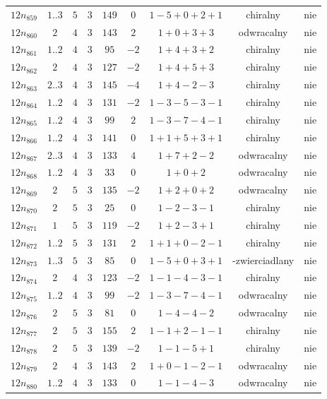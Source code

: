 \begin{longtable}{ccccccccc}
$12n_{859}$ & $1..3$ & $5$ & $3$ & $149$ & $0$ & $1-5+0+2+1$ & chiralny & nie \\
$12n_{860}$ & $2$ & $4$ & $3$ & $143$ & $2$ & $1+0+3+3$ & odwracalny & nie \\
$12n_{861}$ & $1..2$ & $4$ & $3$ & $95$ & $-2$ & $1+4+3+2$ & chiralny & nie \\
$12n_{862}$ & $2$ & $4$ & $3$ & $127$ & $-2$ & $1+4+5+3$ & chiralny & nie \\
$12n_{863}$ & $2..3$ & $4$ & $3$ & $145$ & $-4$ & $1+4-2-3$ & chiralny & nie \\
$12n_{864}$ & $1..2$ & $4$ & $3$ & $131$ & $-2$ & $1-3-5-3-1$ & chiralny & nie \\
$12n_{865}$ & $1..2$ & $4$ & $3$ & $99$ & $2$ & $1-3-7-4-1$ & chiralny & nie \\
$12n_{866}$ & $1..2$ & $4$ & $3$ & $141$ & $0$ & $1+1+5+3+1$ & chiralny & nie \\
$12n_{867}$ & $2..3$ & $4$ & $3$ & $133$ & $4$ & $1+7+2-2$ & odwracalny & nie \\
$12n_{868}$ & $1..2$ & $4$ & $3$ & $33$ & $0$ & $1+0+2$ & odwracalny & nie \\
$12n_{869}$ & $2$ & $5$ & $3$ & $135$ & $-2$ & $1+2+0+2$ & odwracalny & nie \\
$12n_{870}$ & $2$ & $5$ & $3$ & $25$ & $0$ & $1-2-3-1$ & chiralny & nie \\
$12n_{871}$ & $1$ & $5$ & $3$ & $119$ & $-2$ & $1+2-3+1$ & chiralny & nie \\
$12n_{872}$ & $1..2$ & $5$ & $3$ & $131$ & $2$ & $1+1+0-2-1$ & chiralny & nie \\
$12n_{873}$ & $1..3$ & $5$ & $3$ & $85$ & $0$ & $1-5+0+3+1$ & -zwierciadlany & nie \\
$12n_{874}$ & $2$ & $4$ & $3$ & $123$ & $-2$ & $1-1-4-3-1$ & chiralny & nie \\
$12n_{875}$ & $1..2$ & $4$ & $3$ & $99$ & $-2$ & $1-3-7-4-1$ & odwracalny & nie \\
$12n_{876}$ & $2$ & $5$ & $3$ & $81$ & $0$ & $1-4-4-2$ & odwracalny & nie \\
$12n_{877}$ & $2$ & $5$ & $3$ & $155$ & $2$ & $1-1+2-1-1$ & chiralny & nie \\
$12n_{878}$ & $2$ & $5$ & $3$ & $139$ & $-2$ & $1-1-5+1$ & chiralny & nie \\
$12n_{879}$ & $2$ & $4$ & $3$ & $143$ & $2$ & $1+0-1-2-1$ & odwracalny & nie \\
$12n_{880}$ & $1..2$ & $4$ & $3$ & $133$ & $0$ & $1-1-4-3$ & odwracalny & nie \\

\end{longtable}
